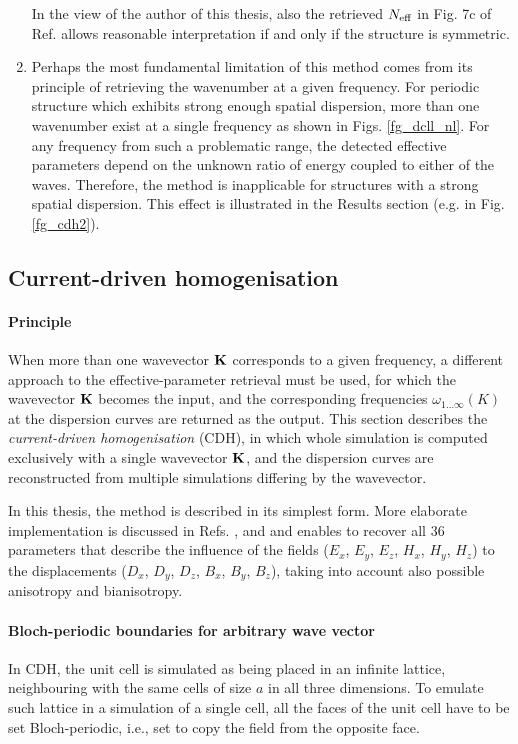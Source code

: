 \begin{enumerate}
{\begin{displayquote}
 \end{displayquote}
 In the view of the author of this thesis, also the retrieved $N_{\text{eff} }$ in Fig. 7c of Ref. \cite[p. 036617-9]{smith2005electromagnetic} allows reasonable interpretation if and only if the structure is symmetric. 
			 }
	     \item{Perhaps the most fundamental limitation of this method comes from its principle of retrieving the wavenumber at a given frequency. For periodic structure which exhibits strong enough spatial dispersion, more than one wavenumber exist at a single frequency as shown in Figs. \ref{fg_dcll_nl}. For any frequency from such a problematic range, the detected effective parameters depend on the unknown ratio of energy coupled to either of the waves. Therefore, the method is inapplicable for structures with a strong spatial dispersion. This effect is illustrated in the Results section (e.g. in Fig. \ref{fg_cdh2}).
			 }
\end{enumerate}


\subsection{Current-driven homogenisation} 
\paragraph{Principle} %
When more than one wavevector ${\mathbf{K}}$ corresponds to a given frequency,  
a different approach to the effective-parameter retrieval must be used, for which the wavevector ${\mathbf{K}}$ becomes the input, and the corresponding frequencies $\omega_{1\ldots\infty}(K)$  at the dispersion curves are returned as the output. 
This section describes the \textit{current-driven homogenisation} (CDH), in which whole simulation is computed exclusively with a single wavevector ${\mathbf{K}}$, and the dispersion curves are reconstructed from multiple simulations differing by the wavevector. 

In this thesis, the method is described in its simplest form. More elaborate implementation is discussed in Refs. \cite{silveirinha2007metamaterial}, \cite{fietz2010current} and \cite{fietz2011homogenization} and enables to recover all 36 parameters that describe the influence of the fields ($E_x$, $E_y$, $E_z$, $H_x$, $H_y$, $H_z$) to the displacements ($D_x$, $D_y$, $D_z$, $B_x$, $B_y$, $B_z$), taking into account also possible anisotropy and bianisotropy.

\paragraph{Bloch-periodic boundaries for arbitrary wave vector} %
In CDH, the unit cell is simulated as being placed in an infinite lattice, neighbouring with the same cells of size $a$ in all three dimensions. To emulate such lattice in a simulation of a single cell, all the faces of the unit cell have to be set Bloch-periodic, i.e., set to copy the field from the opposite face.

